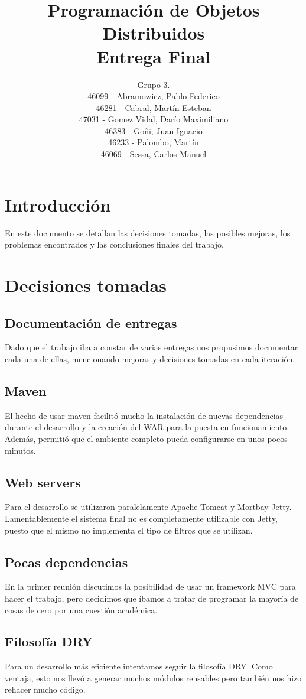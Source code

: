 \documentclass[a4paper,11pt]{article}
\title{
        Programación de Objetos Distribuidos \\
        Entrega Final
    }
\author{
        Grupo 3. \\
        46099 - Abramowicz, Pablo Federico \\
        46281 - Cabral, Martín Esteban \\
        47031 - Gomez Vidal, Darío Maximiliano \\
        46383 - Goñi, Juan Ignacio \\
        46233 - Palombo, Martín \\
        46069 - Sessa, Carlos Manuel
        }
\date{}
\begin{document}
\maketitle
\pagebreak

\section{Introducción}
En este documento se detallan las decisiones tomadas, las posibles mejoras,
los problemas encontrados y las conclusiones finales del trabajo.

\section{Decisiones tomadas}

\subsection{Documentación de entregas}
Dado que el trabajo iba a constar de varias entregas nos propusimos documentar
cada una de ellas, mencionando mejoras y decisiones tomadas en cada iteración.

\subsection{Maven}
El hecho de usar maven facilitó mucho la instalación de nuevas dependencias
durante el desarrollo y la creación del WAR para la puesta en funcionamiento.
Además, permitió que el ambiente completo pueda configurarse en unos pocos
minutos.

\subsection{Web servers}
Para el desarrollo se utilizaron paralelamente Apache Tomcat y Mortbay Jetty.
Lamentablemente el sistema final no es completamente utilizable con Jetty,
puesto que el mismo no implementa el tipo de filtros que se utilizan.

\subsection{Pocas dependencias}
En la primer reunión discutimos la posibilidad de usar un framework MVC para
hacer el trabajo, pero decidimos que íbamos a tratar de programar la mayoría de
cosas de cero por una cuestión académica.

\subsection{Filosofía DRY}
Para un desarrollo más eficiente intentamos seguir la filosofía DRY.
Como ventaja, esto nos llevó a generar muchos módulos reusables pero también
nos hizo rehacer mucho código.
\end{document}
